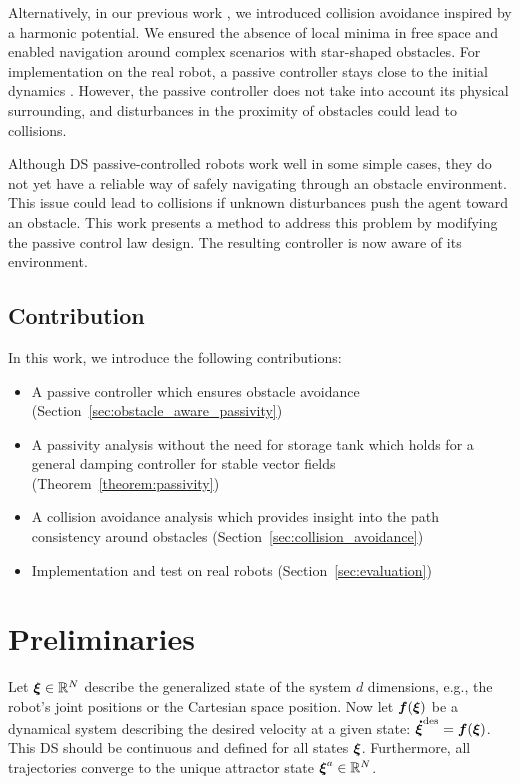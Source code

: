 \documentclass[conference]{IEEEtran}
\begin{document}
Alternatively, in our previous work \cite{huber2019avoidance, huber2023avoidance}, we introduced collision avoidance inspired by a harmonic potential. We ensured the absence of local minima in free space and enabled navigation around complex scenarios with star-shaped obstacles.
For implementation on the real robot, a passive controller stays close to the initial dynamics \cite{kronander2015passive}. However, the passive controller does not take into account its physical surrounding, and disturbances in the proximity of obstacles could lead to collisions.

Although DS passive-controlled robots work well in some simple cases, they do not yet have a reliable way of safely navigating through an obstacle environment. This issue could lead to collisions if unknown disturbances push the agent toward an obstacle. This work presents a method to address this problem by modifying the passive control law design. The resulting controller is now aware of its environment.

\subsection{Contribution}
In this work, we introduce the following contributions:
\begin{itemize}
\item A passive controller which ensures obstacle avoidance (Section~\ref{sec:obstacle_aware_passivity})
\item A passivity analysis without the need for storage tank which holds for a general damping controller for stable vector fields (Theorem~\ref{theorem:passivity})
\item A collision avoidance analysis which provides insight into the path consistency around obstacles (Section~\ref{sec:collision_avoidance})
\item Implementation and test on real robots (Section~\ref{sec:evaluation})
\end{itemize}

\section{Preliminaries}
Let $\boldsymbol{\xi} \in \mathbb{R}^N$ describe the generalized state of the system $d$ dimensions, e.g., the robot's joint positions or the Cartesian space position.
Now let $\boldsymbol{f}(\boldsymbol{\xi})$ be a dynamical system describing the desired velocity at a given state: $\boldsymbol{\dot\xi}^{\mathrm{des}} = \boldsymbol{f}( \boldsymbol{\xi})$.
This DS should be continuous and defined for all states $\boldsymbol{\xi}$. Furthermore, all trajectories converge to the unique attractor state $\boldsymbol{\xi} ^a \in \mathbb{R}^N$. 
\end{document}
